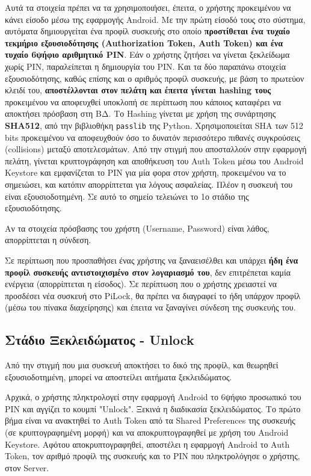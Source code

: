 		Αυτά τα στοιχεία πρέπει να τα χρησιμοποιήσει, έπειτα, ο χρήστης προκειμένου να κάνει είσοδο μέσω της εφαρμογής Android. Με την πρώτη είσοδό τους στο σύστημα, αυτόματα δημιουργείται ένα προφίλ συσκευής στο οποίο \textbf{προστίθεται ένα τυχαίο τεκμήριο εξουσιοδότησης (Authorization Token, Auth Token) και ένα τυχαίο 6ψήφιο αριθμητικό PIN}. Εάν ο χρήστης ζητήσει να γίνεται ξεκλείδωμα χωρίς PIN, παραλείπεται η δημιουργία του PIN. Και τα δύο παραπάνω στοιχεία εξουσιοδότησης, καθώς επίσης και ο αριθμός προφίλ συσκευής, με βάση το πρωτεύον κλειδί του, \textbf{αποστέλλονται στον πελάτη και έπειτα γίνεται hashing τους} προκειμένου να αποφευχθεί υποκλοπή σε περίπτωση που κάποιος καταφέρει να αποκτήσει πρόσβαση στη ΒΔ. Το Hashing γίνεται με χρήση της συνάρτησης \textbf{SHA512}, από την βιβλιοθήκη \verb|passlib| της Python. Χρησιμοποιείται SHA των 512 bits προκειμένου να αποφευχθούν όσο το δυνατόν περισσότερο πιθανές συγκρούσεις (collisions) μεταξύ αποτελεσμάτων. Από την στιγμή που αποσταλλούν στην εφαρμογή πελάτη, γίνεται κρυπτογράφηση και αποθήκευση του Auth Token μέσω του Android Keystore και εμφανίζεται το PIN για μία φορα στον χρήστη, προκειμένου να το σημειώσει, και κατόπιν απορρίπτεται για λόγους ασφαλείας. Πλέον η συσκευή του είναι εξουσιοδοτημένη. Σε αυτό το σημείο τελειώνει το 1ο στάδιο της εξουσιοδότησης.

		Αν τα στοιχεία πρόσβασης του χρήστη (Username, Password) είναι λάθος, απορρίπτεται η σύνδεση.

		Σε περίπτωση που προσπαθήσει ένας χρήστης να ξαναεισέλθει και υπάρχει \textbf{ήδη ένα προφίλ συσκευής αντιστοιχισμένο στον λογαριασμό του}, δεν επιτρέπεται καμία ενέργεια (απορρίπτεται η είσοδος). Σε περίπτωση που ο χρήστης χρειαστεί να προσδέσει νέα συσκευή στο PiLock, θα πρέπει να διαγραφεί το ήδη υπάρχον προφίλ (μέσω του πίνακα διαχείρησης) και έπειτα να ξαναγίνει σύνδεση της συσκευής του.


	\subsection{Στάδιο Ξεκλειδώματος - Unlock}
		Από την στιγμή που μια συσκευή αποκτήσει το δικό της προφίλ, και θεωρηθεί εξουσιοδοτημένη, μπορεί να αποστείλει αιτήματα ξεκλειδώματος.

		Αρχικά, ο χρήστης πληκτρολογεί στην εφαρμογή Android το 6ψήφιο προσωπικό του PIN και αγγίζει το κουμπί "Unlock". Ξεκινά η διαδικασία ξεκλειδώματος. Το πρώτο βήμα είναι να ανακτηθεί το Auth Token από τα Shared Preferences της συσκευής (σε κρυπτογραφημένη μορφή) και να αποκρυπτογραφηθεί με χρήση του Android Keystore. Αφότου αποκρυπτογραφηθεί, αποστέλει η εφαρμογή Android το Auth Token, τον αριθμό προφίλ της συσκευής και το PIN που πληκτρολόγησε ο χρήστης, στον Server.

